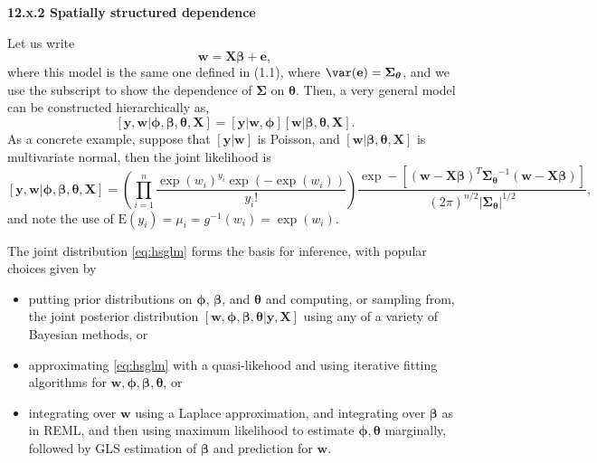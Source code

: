 \documentclass[12pt, titlepage]{article}
\begin{document}
{\large \flushleft \textbf{12.x.2 Spatially structured dependence}}

Let us write
$$
\mathbf{w} = \mathbf{X}\boldsymbol{\beta} + \mathbf{e},
$$
where this model is the same one defined in (1.1), where $\var(\mathbf{e}) = \boldsymbol{\Sigma}_{\boldsymbol{\theta}}$, and we use the subscript to show the dependence of $\boldsymbol{\Sigma}$ on $\boldsymbol{\theta}$. Then, a very general model can be constructed hierarchically as,
\begin{equation} \label{eq:hsglm}
[\mathbf{y},\mathbf{w}|\boldsymbol{\phi},\boldsymbol{\beta},\boldsymbol{\theta},\mathbf{X}] = [\mathbf{y}|\mathbf{w},\boldsymbol{\phi}][\mathbf{w}|\boldsymbol{\beta},\boldsymbol{\theta},\mathbf{X}].
\end{equation}
As a concrete example, suppose that $[\mathbf{y}|\mathbf{w}]$ is Poisson, and $[\mathbf{w}|\boldsymbol{\beta},\boldsymbol{\theta},\mathbf{X}]$ is multivariate normal, then the joint likelihood is
$$
[\mathbf{y},\mathbf{w}|\boldsymbol{\phi},\boldsymbol{\beta},\boldsymbol{\theta},\mathbf{X}] = \left(\prod_{i=1}^{n}\frac{\exp(w_{i})^{y_{i}}\exp(-\exp(w_i))}{y_{i}!}\right)\frac{\exp-[(\mathbf{w} - \mathbf{X}\boldsymbol{\beta})^{T}\boldsymbol{\Sigma_{\boldsymbol{\theta}}}^{-1}(\mathbf{w} - \mathbf{X}\boldsymbol{\beta})]}{(2\pi)^{n/2}|\boldsymbol{\Sigma_{\boldsymbol{\theta}}}|^{1/2}},
$$
and note the use of $\textrm{E}(y_{i}) = \mu_{i} = g^{-1}(w_{i}) = \exp(w_{i})$.

The joint distribution \ref{eq:hsglm} forms the basis for inference, with popular choices given by
\begin{itemize}
\item putting prior distributions on $\boldsymbol{\phi}$, $\boldsymbol{\beta}$, and $\boldsymbol{\theta}$ and computing, or sampling from, the joint posterior distribution $[\mathbf{w},\boldsymbol{\phi},\boldsymbol{\beta},\boldsymbol{\theta}|\mathbf{y},\mathbf{X}]$ using any of a variety of Bayesian methods, or 
\item approximating \eqref{eq:hsglm} with a quasi-likehood and using iterative fitting algorithms for $\mathbf{w},\boldsymbol{\phi},\boldsymbol{\beta},\boldsymbol{\theta}$, or
\item integrating over $\mathbf{w}$ using a Laplace approximation, and integrating over $\boldsymbol{\beta}$ as in REML, and then using maximum likelihood to estimate $\boldsymbol{\phi},\boldsymbol{\theta}$ marginally, followed by GLS estimation of $\boldsymbol{\beta}$ and prediction for $\mathbf{w}$.
\end{itemize}
\end{document}
